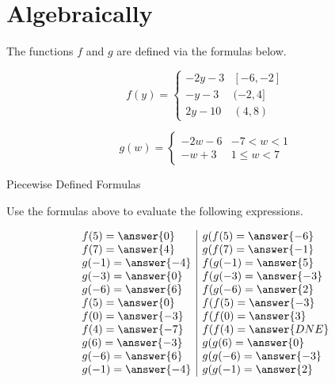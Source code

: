 \documentclass{ximera}
\begin{document}
\section{Algebraically}


The functions $f$ and $g$ are defined via the formulas below.






\[
f(y) = 
\begin{cases}
  -2y-3 &  [-6, -2]   \\
  -y-3 &  (-2, 4]  \\
  2y - 10 & (4,8)
\end{cases}
\]












\[
g(w) = 
\begin{cases}
  -2w-6 &   -7 < w < 1 \\
  -w+3 &  1 \leq w < 7
\end{cases}
\]












\begin{question} Piecewise Defined Formulas

Use the formulas above to evaluate the following expressions.



\[
\begin{array}{l|l}
f(5) = \answer{0}  & g(f(5) = \answer{-6}   \\
f(7) = \answer{4}  & g(f(7) = \answer{-1}   \\
g(-1) = \answer{-4}  & f(g(-1) = \answer{5}   \\
g(-3) = \answer{0}  & f(g(-3) = \answer{-3}   \\
g(-6) = \answer{6}  & f(g(-6) = \answer{2}   \\
f(5) = \answer{0}  & f(f(5) = \answer{-3}   \\
f(0) = \answer{-3}  & f(f(0) = \answer{3}   \\
f(4) = \answer{-7}  & f(f(4) = \answer{DNE}   \\
g(6) = \answer{-3}  & g(g(6) = \answer{0}   \\
g(-6) = \answer{6}  & g(g(-6) = \answer{-3}   \\
g(-1) = \answer{-4}  & g(g(-1) = \answer{2}   \\
\end{array}
\]



\end{question}
\end{document}
